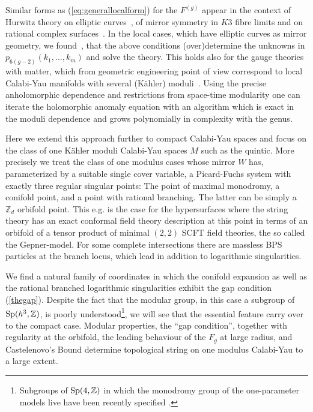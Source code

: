 \documentclass[12pt]{article}
\begin{document}
Similar forms as (\ref{eq:generallocalform}) for the $F^{(g)}$ 
appear in the context of Hurwitz theory on elliptic 
curves~\cite{dijkgraafzagier}, of mirror symmetry in $K3$ 
fibre limits\cite{Marino:1998} and on rational 
complex surfaces~\cite{Hosono:1999qc,Hosono:2001gf}.
In the local cases, which have elliptic curves as mirror geometry,
we found~\cite{Huang,Huang2}, that the above conditions
(over)determine the unknowns in $p_{6(g-2)}(k_1,\ldots,k_m)$ and
solve the theory. This holds also for the gauge theories with
matter, which from geometric engineering point of view correspond
to local Calabi-Yau manifolds with several (K\"ahler)
moduli~\cite{Huang2}. Using the precise anholomorphic
dependence and restrictions from space-time modularity one can
iterate the holomorphic anomaly equation with an algorithm which
is exact in the moduli dependence and grows polynomially in
complexity with the genus.

Here we extend this approach further to compact Calabi-Yau spaces
and focus on the class of one K\"ahler moduli Calabi-Yau spaces
$M$ such as the quintic. More precisely we treat the class of one
modulus cases whose mirror $W$ has, parameterized by a suitable
single cover variable, a Picard-Fuchs system  with exactly three
regular singular points: The point of maximal monodromy, a
conifold point, and a point with rational branching. The latter can
be simply a $\mathbb{Z}_d$ orbifold point. This e.g. is the case
for the hypersurfaces where the string theory has an exact
conformal field theory description at this point in terms of an
orbifold of a tensor product of minimal $(2,2)$ SCFT field
theories, the so called the Gepner-model. For some complete
intersections there are massless BPS particles at the branch
locus, which lead in addition to logarithmic singularities.

We find a natural family of coordinates in which the conifold
expansion as well as the rational branched logarithmic
singularities exhibit the gap condition (\ref{thegap}). Despite
the fact that the modular group, in this case a subgroup of ${\rm
Sp}(h^3,\mathbb{Z})$, is poorly understood\footnote{Subgroups of
${\rm Sp}(4,\mathbb{Z})$ in which the monodromy group of the
one-parameter models live have been recently specified
\cite{cyy}.}, we will see that the essential feature carry over to
the compact case. Modular properties, the ``gap condition'',
together with regularity at the orbifold, the leading behaviour
of the $F_g$ at large radius, and Castelenovo's Bound 
determine topological string on one modulus 
Calabi-Yau to a large extent.
\end{document}
